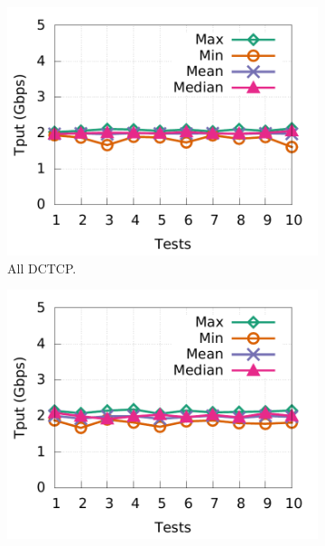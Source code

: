 \begin{figure}[!t]
        \centering
        \begin{subfigure}[b]{0.45\textwidth}
                \centering
                \includegraphics[width=\textwidth]{acdctcp/figures/tput_fairness/ecn_all_dctcp_tput.pdf}
                \caption{All DCTCP.}
                \label{fairness_5CC_with_dctcp}
        \end{subfigure}
        \begin{subfigure}[b]{0.45\textwidth}
                \centering
                \includegraphics[width=\textwidth]{acdctcp/figures/tput_fairness/liquid_5CC_tput.pdf}

\end{subfigure}
\end{figure}
